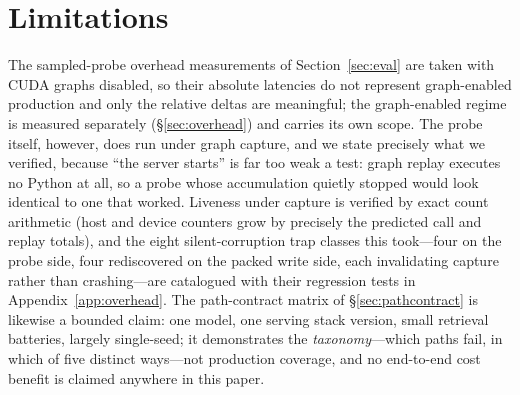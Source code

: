 \documentclass[11pt]{article}
\begin{document}
\section{Limitations}
\label{sec:limits}
The sampled-probe overhead measurements of Section~\ref{sec:eval} are taken
with CUDA graphs disabled, so their absolute latencies do not represent
graph-enabled production and only the relative deltas are meaningful; the
graph-enabled regime is measured separately (\S\ref{sec:overhead}) and
carries its own scope. The probe itself, however, does run under
graph capture, and we state precisely what we verified, because ``the server starts''
is far too weak a test: graph replay executes no Python at all, so a probe whose
accumulation quietly stopped would look identical to one that worked. Liveness under
capture is verified by exact count arithmetic (host and device counters
grow by precisely the predicted call and replay totals), and the eight
silent-corruption trap classes this took---four on the probe side, four
rediscovered on the packed write side, each invalidating capture rather
than crashing---are catalogued with their regression tests in
Appendix~\ref{app:overhead}. The path-contract matrix of
\S\ref{sec:pathcontract} is likewise a bounded claim: one model, one
serving stack version, small retrieval batteries, largely single-seed; it
demonstrates the \emph{taxonomy}---which paths fail, in which of five
distinct ways---not production coverage, and no end-to-end cost benefit is
claimed anywhere in this paper.
\end{document}
